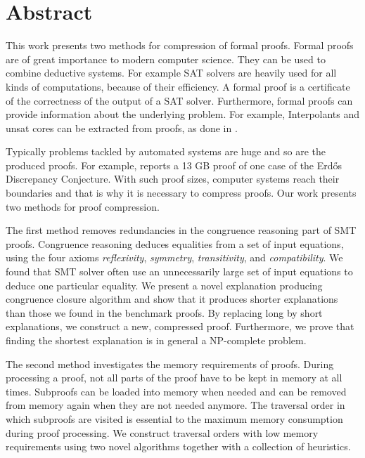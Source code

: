 \chapter*{Abstract}

This work presents two methods for compression of formal proofs.
Formal proofs are of great importance to modern computer science.
They can be used to combine deductive systems.
For example SAT solvers \cite{Biere2009} are heavily used for all kinds of computations, because of their efficiency.
A formal proof is a certificate of the correctness of the output of a SAT solver.
Furthermore, formal proofs can provide information about the underlying problem.
For example, Interpolants \cite{McMill2005} and unsat cores can be extracted from proofs, as done in \cite{Hofferek2013}.

Typically problems tackled by automated systems are huge and so are the produced proofs.
For example, \cite{Konev2014} reports a 13 GB proof of one case of the Erd\H{o}s Discrepancy Conjecture.
With such proof sizes, computer systems reach their boundaries and that is why it is necessary to compress proofs.
Our work presents two methods for proof compression.

The first method removes redundancies in the congruence reasoning part of SMT proofs.
Congruence reasoning deduces equalities from a set of input equations, using the four axioms \emph{reflexivity}, \emph{symmetry}, \emph{transitivity}, and \emph{compatibility}.
We found that SMT solver often use an unnecessarily large set of input equations to deduce one particular equality.
We present a novel explanation producing congruence closure algorithm and show that it produces shorter explanations than those we found in the benchmark proofs.
By replacing long by short explanations, we construct a new, compressed proof.
Furthermore, we prove that finding the shortest explanation is in general a NP-complete problem.

The second method investigates the memory requirements of proofs.
During processing a proof, not all parts of the proof have to be kept in memory at all times.
Subproofs can be loaded into memory when needed and can be removed from memory again when they are not needed anymore.
The traversal order in which subproofs are visited is essential to the maximum memory consumption during proof processing.
We construct traversal orders with low memory requirements using two novel algorithms together with a collection of heuristics. 

